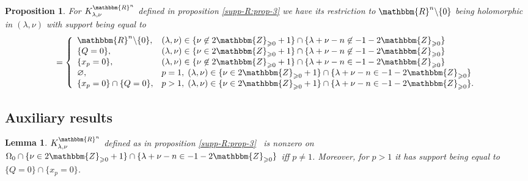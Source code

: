 \documentclass{article}
\newcommand{\nin}{\not\in}
\numberwithin{definition}{section}
\newtheorem{lemma}{Lemma}
\numberwithin{lemma}{section}
\newtheorem{proposition}{Proposition}
\numberwithin{proposition}{section}
{\theorembodyfont{\rmfamily}\newtheorem{remark}{Remark}
\numberwithin{remark}{section}
}
\begin{document}
\begin{proposition}
  \label{KR-normalization-recur:prop-supp}For $K_{\lambda,
  \nu}^{\mathbbm{R}^n}$ defined in proposition \ref{supp-R:prop-3} we have its
  restriction to $\mathbbm{R}^n \backslash \{ 0 \}$ being holomorphic in $(
  \lambda, \nu)$ with support being equal to
  \[ = \left\{ \begin{array}{ll}
       \mathbbm{R}^n \backslash \{ 0 \}, & ( \lambda, \nu) \in \{ \nu \nin
       2\mathbbm{Z}_{\geqslant 0} + 1 \} \cap \{ \lambda + \nu - n \nin - 1 -
       2\mathbbm{Z}_{\geqslant 0} \}\\
       \{ Q = 0 \}, & ( \lambda, \nu) \in \{ \nu \in 2\mathbbm{Z}_{\geqslant
       0} + 1 \} \cap \{ \lambda + \nu - n \nin - 1 - 2\mathbbm{Z}_{\geqslant
       0} \}\\
       \{ x_p = 0 \}, & ( \lambda, \nu) \in \{ \nu \nin
       2\mathbbm{Z}_{\geqslant 0} + 1 \} \cap \{ \lambda + \nu - n \in - 1 -
       2\mathbbm{Z}_{\geqslant 0} \}\\
       \varnothing, & p = 1, \; ( \lambda, \nu) \in \{ \nu \in
       2\mathbbm{Z}_{\geqslant 0} + 1 \} \cap \{ \lambda + \nu - n \in - 1 -
       2\mathbbm{Z}_{\geqslant 0} \}\\
       \{ x_p = 0 \} \cap \{ Q = 0 \}, & p > 1, \; ( \lambda, \nu) \in \{ \nu
       \in 2\mathbbm{Z}_{\geqslant 0} + 1 \} \cap \{ \lambda + \nu - n \in - 1
       - 2\mathbbm{Z}_{\geqslant 0} \} .
     \end{array} \right. \]
\end{proposition}

\subsection{Auxiliary results}

\begin{lemma}
  \label{KR-normalization-recur:lem-nonvanishing-ss}$K^{\mathbbm{R}^n}_{\lambda,
  \nu}$ defined as in proposition \ref{supp-R:prop-3} \ is nonzero on
  $\Omega_0 \cap \{ \nu \in 2\mathbbm{Z}_{\geqslant 0} + 1 \} \cap \{ \lambda
  + \nu - n \in - 1 - 2\mathbbm{Z}_{\geqslant 0} \}$ iff $p \neq 1$. Moreover,
  for $p > 1$ it has support being equal to $\{ Q = 0 \} \cap \{ x_p = 0 \}$.
\end{lemma}
\end{document}
